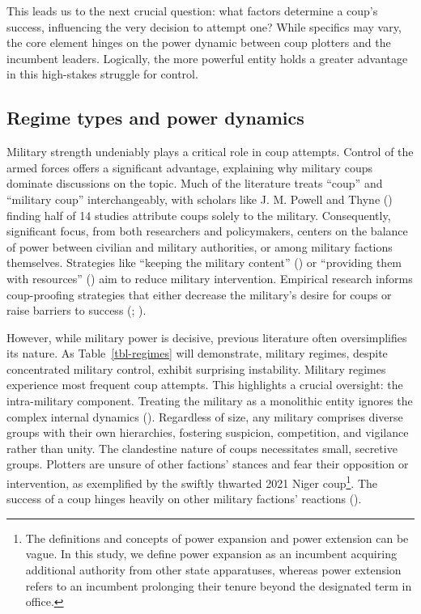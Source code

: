 \documentclass[
  12pt,
]{report}
\begin{document}
This leads us to the next crucial question: what factors determine a
coup's success, influencing the very decision to attempt one? While
specifics may vary, the core element hinges on the power dynamic between
coup plotters and the incumbent leaders. Logically, the more powerful
entity holds a greater advantage in this high-stakes struggle for
control.

\subsection{Regime types and power
dynamics}\label{regime-types-and-power-dynamics}

Military strength undeniably plays a critical role in coup attempts.
Control of the armed forces offers a significant advantage, explaining
why military coups dominate discussions on the topic. Much of the
literature treats ``coup'' and ``military coup'' interchangeably, with
scholars like J. M. Powell and Thyne ()
finding half of 14 studies attribute coups solely to the military.
Consequently, significant focus, from both researchers and policymakers,
centers on the balance of power between civilian and military
authorities, or among military factions themselves. Strategies like
``keeping the military content'' () or ``providing them with resources''
() aim to
reduce military intervention. Empirical research informs coup-proofing
strategies that either decrease the military's desire for coups or raise
barriers to success (;
).

However, while military power is decisive, previous literature often
oversimplifies its nature. As Table~\ref{tbl-regimes} will demonstrate,
military regimes, despite concentrated military control, exhibit
surprising instability. Military regimes experience most frequent coup
attempts. This highlights a crucial oversight: the intra-military
component. Treating the military as a monolithic entity ignores the
complex internal dynamics ().
Regardless of size, any military comprises diverse groups with their own
hierarchies, fostering suspicion, competition, and vigilance rather than
unity. The clandestine nature of coups necessitates small, secretive
groups. Plotters are unsure of other factions' stances and fear their
opposition or intervention, as exemplified by the swiftly thwarted 2021
Niger coup\footnote{The definitions and concepts of power expansion and
  power extension can be vague. In this study, we define power expansion
  as an incumbent acquiring additional authority from other state
  apparatuses, whereas power extension refers to an incumbent prolonging
  their tenure beyond the designated term in office.}. The success of a
coup hinges heavily on other military factions' reactions
().
\end{document}
